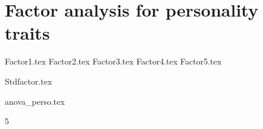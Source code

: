 \documentclass[a4paper, 11pt, onecolumn]{article}
\begin{document}
\clearpage
\newpage
\section{Factor analysis for personality traits}
\label{section:efa_big5}

{Factor1.tex}
{Factor2.tex}
{Factor3.tex}
{Factor4.tex}
{Factor5.tex}

{Stdfactor.tex}

{anova_perso.tex}






\clearpage
\newpage
\setcounter{tocdepth}5
\tableofcontents

\end{document}
